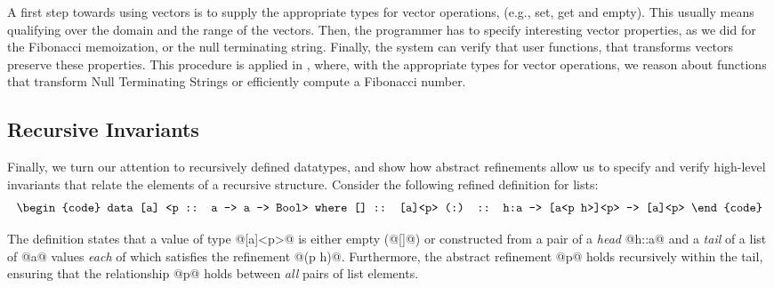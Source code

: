 A first step towards using vectors is 
to supply the appropriate types 
for vector operations, (e.g.,
set, get and empty).
This usually means qualifying
over the domain and the range of the vectors. 
%
Then, the programmer has to specify interesting vector properties, 
as we did for the Fibonacci memoization, or the null terminating string.
% 
Finally, the system can verify that user functions, that transforms vectors
preserve these properties.
%
This procedure is applied in \cite{Vazou13},
where, with the appropriate types for vector operations,
we reason about functions that transform Null Terminating Strings
or efficiently compute a Fibonacci number.
%


\subsection{Recursive Invariants}
Finally, we turn our attention to recursively defined datatypes, and show 
how abstract refinements allow us to specify and verify high-level
invariants that relate the elements of a recursive structure.
Consider the following refined definition for lists:
%
$$\centering\begin{tabular}{c}\begin{code}
data [a] <p :: a -> a -> Bool> where
  []  :: [a]<p>
  (:) :: h:a -> [a<p h>]<p> -> [a]<p>
\end{code}\end{tabular}$$

The definition states that a value of type @[a]<p>@ 
is either empty (@[]@) or constructed from a pair of  
a \emph{head} @h::a@ and a \emph{tail} of a list of 
@a@ values \emph{each} of which satisfies the refinement @(p h)@. 
Furthermore, the abstract refinement @p@ holds recursively
within the tail, ensuring that the relationship @p@ 
holds between \emph{all} pairs of list elements.

